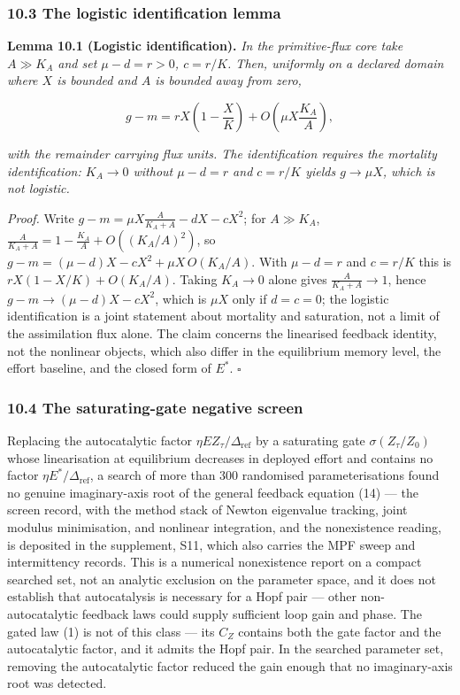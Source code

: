 \documentclass[11pt]{article}
\begin{document}
\subsubsection{10.3 The logistic identification
lemma}\label{the-logistic-identification-lemma}

\textbf{Lemma 10.1 (Logistic identification).} \emph{In the
primitive-flux core take \(A \gg K_A\) and set \(\mu - d = r > 0\),
\(c = r/K\). Then, uniformly on a declared domain where \(X\) is bounded
and \(A\) is bounded away from zero,}

\[g - m = rX\left(1 - \frac{X}{K}\right) + O\left(\mu X \frac{K_A}{A}\right),\]

\emph{with the remainder carrying flux units. The identification
requires the mortality identification: \(K_A \to 0\) without
\(\mu - d = r\) and \(c = r/K\) yields \(g \to \mu X\), which is not
logistic.}

\emph{Proof.} Write \(g - m = \mu X \frac{A}{K_A + A} - dX - cX^2\); for
\(A \gg K_A\), \(\frac{A}{K_A + A} = 1 - \frac{K_A}{A} + O((K_A/A)^2)\),
so \(g - m = (\mu - d)X - cX^2 + \mu X\,O(K_A/A)\). With \(\mu - d = r\)
and \(c = r/K\) this is \(rX(1 - X/K) + O(K_A/A)\). Taking \(K_A \to 0\)
alone gives \(\frac{A}{K_A + A} \to 1\), hence
\(g - m \to (\mu - d)X - cX^2\), which is \(\mu X\) only if
\(d = c = 0\); the logistic identification is a joint statement about
mortality and saturation, not a limit of the assimilation flux alone.
The claim concerns the linearised feedback identity, not the nonlinear
objects, which also differ in the equilibrium memory level, the effort
baseline, and the closed form of \(E^*\). \ensuremath{\square}

\subsubsection{10.4 The saturating-gate negative
screen}\label{the-saturating-gate-negative-screen}

Replacing the autocatalytic factor
\(\eta E Z_\tau/\Delta_{\mathrm{ref}}\) by a saturating gate
\(\sigma(Z_\tau/Z_0)\) whose linearisation at equilibrium decreases in
deployed effort and contains no factor
\(\eta E^*/\Delta_{\mathrm{ref}}\), a search of more than 300 randomised
parameterisations found no genuine imaginary-axis root of the general
feedback equation (14) --- the screen record, with the method stack of
Newton eigenvalue tracking, joint modulus minimisation, and nonlinear
integration, and the nonexistence reading, is deposited in the
supplement, S11, which also carries the MPF sweep and intermittency
records. This is a numerical nonexistence report on a compact searched
set, not an analytic exclusion on the parameter space, and it does not
establish that autocatalysis is necessary for a Hopf pair --- other
non-autocatalytic feedback laws could supply sufficient loop gain and
phase. The gated law (1) is not of this class --- its \(C_Z\) contains
both the gate factor and the autocatalytic factor, and it admits the
Hopf pair. In the searched parameter set, removing the autocatalytic
factor reduced the gain enough that no imaginary-axis root was detected.
\end{document}

